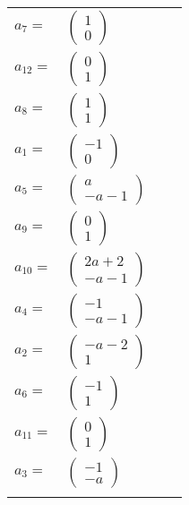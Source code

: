\documentclass[1p]{elsarticle_modified}
\theoremstyle{definition}
\begin{document}
\begin{tabular}{m{7pt} m{180pt} m{7pt} m{180pt} }
\flushright $a_{7}=$&$\begin{pmatrix}1\\0\end{pmatrix}$ \\
\flushright $a_{12}=$&$\begin{pmatrix}0\\1\end{pmatrix}$ \\
\flushright $a_{8}=$&$\begin{pmatrix}1\\1\end{pmatrix}$ \\
\flushright $a_{1}=$&$\begin{pmatrix}-1\\0\end{pmatrix}$ \\
\flushright $a_{5}=$&$\begin{pmatrix}a\\- a-1\end{pmatrix}$ \\
\flushright $a_{9}=$&$\begin{pmatrix}0\\1\end{pmatrix}$ \\
\flushright $a_{10}=$&$\begin{pmatrix}2 a+2\\- a-1\end{pmatrix}$ \\
\flushright $a_{4}=$&$\begin{pmatrix}-1\\- a-1\end{pmatrix}$ \\
\flushright $a_{2}=$&$\begin{pmatrix}- a-2\\1\end{pmatrix}$ \\
\flushright $a_{6}=$&$\begin{pmatrix}-1\\1\end{pmatrix}$ \\
\flushright $a_{11}=$&$\begin{pmatrix}0\\1\end{pmatrix}$ \\
\flushright $a_{3}=$&$\begin{pmatrix}-1\\- a\end{pmatrix}$\\&\end{tabular}
\end{document}
